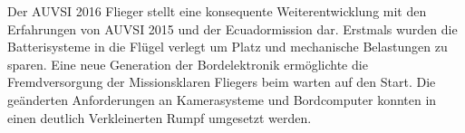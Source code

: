 Der AUVSI 2016 Flieger stellt eine konsequente Weiterentwicklung mit den Erfahrungen von AUVSI 2015 und der Ecuadormission dar. Erstmals wurden die Batterisysteme in die Flügel verlegt um Platz und mechanische Belastungen zu sparen. Eine neue Generation der Bordelektronik ermöglichte die Fremdversorgung der Missionsklaren Fliegers beim warten auf den Start. Die geänderten Anforderungen an Kamerasysteme und Bordcomputer konnten in einen deutlich Verkleinerten Rumpf umgesetzt werden. 